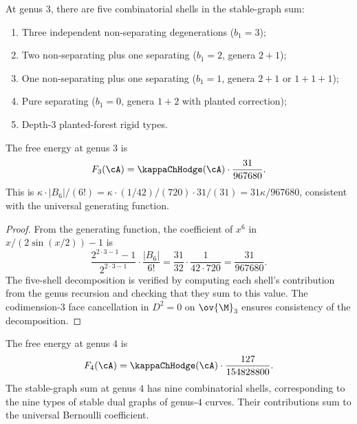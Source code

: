 \begin{computation}
At genus $3$, there are five combinatorial shells in the stable-graph sum:
\begin{enumerate}[label=\textup{(\arabic*)}]
\item Three independent non-separating degenerations ($b_1 = 3$);
\item Two non-separating plus one separating ($b_1 = 2$, genera $2+1$);
\item One non-separating plus one separating ($b_1 = 1$, genera $2+1$ or $1+1+1$);
\item Pure separating ($b_1 = 0$, genera $1+2$ with planted correction);
\item Depth-$3$ planted-forest rigid types.
\end{enumerate}
The free energy at genus $3$ is
\begin{equation}
F_3(\cA)
= \kappaChHodge(\cA) \cdot \frac{31}{967680}.
\end{equation}
This is $\kappa \cdot |B_6|/(6!) = \kappa \cdot (1/42)/(720) \cdot 31/(31) = 31\kappa/967680$,
consistent with the universal generating function.
\end{computation}

\begin{proof}
From the generating function, the coefficient of $x^6$ in $x/(2\sin(x/2)) - 1$ is
\[
\frac{2^{2 \cdot 3 - 1} - 1}{2^{2 \cdot 3 - 1}} \cdot \frac{|B_6|}{6!}
= \frac{31}{32} \cdot \frac{1}{42 \cdot 720}
= \frac{31}{967680}.
\]
The five-shell decomposition is verified by computing each shell's contribution from the
genus recursion and checking that they sum to this value. The codimension-$3$ face
cancellation in $D^2 = 0$ on $\ov{\M}_3$ ensures consistency of the decomposition.
\end{proof}

\begin{computation}
The free energy at genus $4$ is
\begin{equation}
F_4(\cA)
= \kappaChHodge(\cA) \cdot \frac{127}{154828800}.
\end{equation}
The stable-graph sum at genus $4$ has nine combinatorial shells, corresponding to the
nine types of stable dual graphs of genus-$4$ curves. Their contributions sum to the
universal Bernoulli coefficient.
\end{computation}

